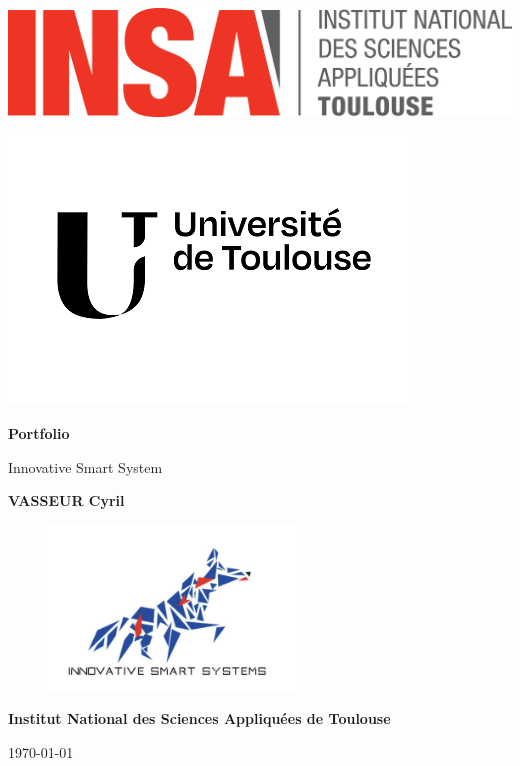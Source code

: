 \documentclass[a4paper, 14.49998pt]{report}
\begin{document}
\raggedbottom
\begin{titlepage}
    \centering

    
    \noindent 
    \begin{minipage}{0.5\textwidth}
        \includegraphics[width=0.5\linewidth]{image/Logo_INSAToulouse-quadri.png} 
    \end{minipage}%
    \hfill 
    \begin{minipage}{0.5\textwidth}
        \flushright 
        \includegraphics[width=0.5\linewidth]{image/logo_universite_toulouse.png}
    \end{minipage}


    \vspace*{2cm} 
    {\Huge\bfseries Portfolio \par}
    \vspace{1cm}
    {\huge Innovative Smart System \par}
    \vspace{2cm}
    {\Large \textbf{VASSEUR Cyril} \par}
    \vspace{2cm}

    \begin{figure}[H]
        \centering
        \includegraphics[width=0.6\textwidth]{image/LOGO_ISS.png}
    \end{figure}
    
    \vfill
    {\Large \textbf{Institut National des Sciences Appliquées de Toulouse} \par}
    \vspace{1cm}
    {\large \today \par}
\end{titlepage}
\end{document}
